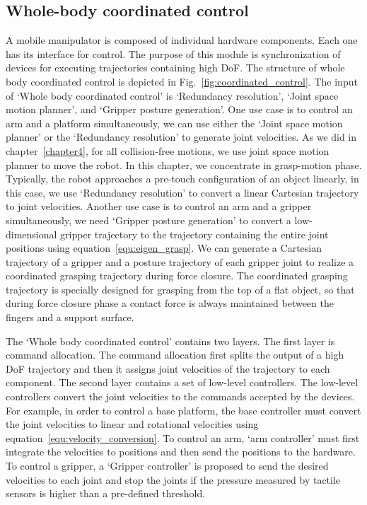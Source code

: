 \subsection{Whole-body coordinated control}
A mobile manipulator is composed of individual hardware components. Each one has its interface for control. The   purpose of this module is synchronization of devices for executing trajectories containing high DoF. The structure of whole body coordinated control is depicted in Fig.~\ref{fig:coordinated_control}. The input of `Whole body coordinated control' is `Redundancy resolution', `Joint space motion planner', and `Gripper posture generation'. One use case is to control an arm and a platform simultaneously, we can use either the `Joint space motion planner' or the  `Redundancy resolution' to generate joint velocities.  As we did in chapter~\ref{chapter4}, for all collision-free motions, we use joint space motion planner to move the robot. In this chapter, we concentrate in grasp-motion phase. Typically, the robot approaches a pre-touch configuration of an object linearly, in this case, we use `Redundancy resolution' to convert a linear Cartesian trajectory to joint velocities. Another use case is to control an arm and a gripper simultaneously, we need `Gripper posture generation' to convert a low-dimensional gripper trajectory to the trajectory containing the entire joint positions using equation~\ref{equ:eigen_grasp}. We can generate a Cartesian trajectory of a gripper and a posture trajectory of each gripper joint to realize a coordinated grasping trajectory during force closure. The coordinated grasping trajectory is specially designed for grasping from the top of a flat object, so that during force closure phase a contact force is always maintained between the fingers and a support surface.   

The `Whole body coordinated control' contains two layers. The first layer is command allocation. The command allocation first splits the output of a high DoF trajectory and then it assigns joint velocities of the trajectory to each component. The second layer contains a set of low-level controllers. The low-level controllers convert the joint velocities to the commands accepted by the devices. For example, in order to control a base platform, the base controller must convert the joint velocities to linear and rotational velocities using equation~\ref{equ:velocity_conversion}. To control an arm, `arm controller' must first integrate the velocities to positions and then send the positions to the hardware. To control a gripper, a `Gripper controller' is proposed to send the desired velocities to each joint and stop the joints if the pressure measured by tactile sensors is higher than a pre-defined threshold. 

